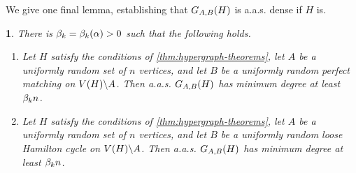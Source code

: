 \documentclass[11pt,english]{article}
\theoremstyle{plain}
\theoremstyle{definition}
\theoremstyle{definition}
\theoremstyle{plain}
\theoremstyle{plain}
\theoremstyle{plain}
\newtheorem{lem}[thm]{\protect\lemmaname}
\theoremstyle{plain}
\theoremstyle{remark}
\theoremstyle{remark}
\let\originalleft\left
\let\originalright\right
\renewcommand{\left}{\mathopen{}\mathclose\bgroup\originalleft}
\renewcommand{\right}{\aftergroup\egroup\originalright}
\providecommand{\lemmaname}{Lemma}
\begin{document}
We give one final lemma, establishing that $G_{A,B}\left(H\right)$ is a.a.s. dense if $H$ is.
\begin{lem}
\label{lem:hypergraph-bipartite-degree-transfer}There is $\a=\a\left(\alpha\right)>0$ such that the following
holds.

\begin{enumerate}[topsep=0px,label=(\alph*)]

\item{\label{itm:hypergraph-bipartite-matching-degree-transfer}Let $H$ satisfy the conditions of \ref{thm:hypergraph-theorems},
let $A$ be a uniformly random set of $n$ vertices, and let $B$
be a uniformly random perfect matching on $V\left(H\right)\backslash A$.
Then a.a.s. $G_{A,B}\left(H\right)$ has minimum degree at least $\beta_k n$.}

\item{\label{itm:hypergraph-bipartite-cycle-degree-transfer}Let $H$ satisfy the conditions of \ref{thm:hypergraph-theorems},
let $A$ be a uniformly random set of $n$ vertices, and let $B$
be a uniformly random loose Hamilton cycle on $V\left(H\right)\backslash A$.
Then a.a.s. $G_{A,B}\left(H\right)$ has minimum degree at least $\beta_k n$.}

\end{enumerate}\end{lem}
\end{document}

